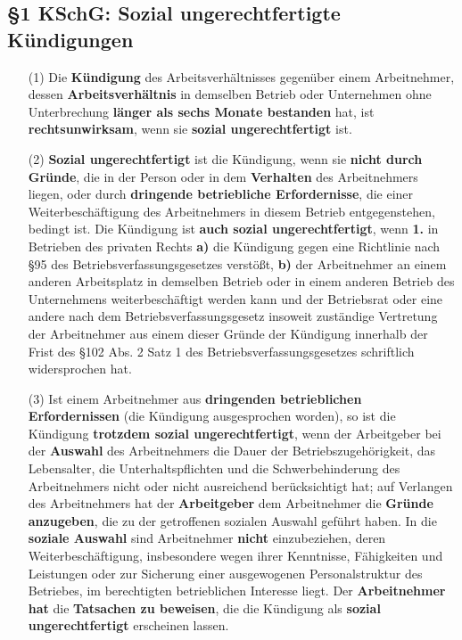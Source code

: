 \documentclass[a4paper, 12pt]{report}
\begin{document}
\subsection{\S 1 KSchG: Sozial ungerechtfertigte Kündigungen}

\begin{itemize}
    \item[(1)] Die \textbf{Kündigung} des Arbeitsverhältnisses gegenüber einem
	Arbeitnehmer, dessen \textbf{Arbeitsverhältnis} in demselben Betrieb
	oder Unternehmen ohne Unterbrechung \textbf{länger als sechs Monate
	bestanden} hat, ist \textbf{rechtsunwirksam}, wenn sie \textbf{sozial
	ungerechtfertigt} ist.
    \item[(2)] \textbf{Sozial ungerechtfertigt} ist die Kündigung, wenn sie
	\textbf{nicht durch Gründe}, die in der Person oder in dem
	\textbf{Verhalten} des Arbeitnehmers liegen, oder durch
	\textbf{dringende betriebliche Erfordernisse}, die einer
	Weiterbeschäftigung des Arbeitnehmers in diesem Betrieb entgegenstehen,
	bedingt ist. Die Kündigung ist \textbf{auch sozial ungerechtfertigt},
	wenn \textbf{1.} in Betrieben des privaten Rechts \textbf{a)} die
	Kündigung gegen eine Richtlinie nach \S 95 des
	Betriebsverfassungsgesetzes verstößt, \textbf{b)} der Arbeitnehmer an
	einem anderen Arbeitsplatz in demselben Betrieb oder in einem anderen
	Betrieb des Unternehmens weiterbeschäftigt werden kann und der
	Betriebsrat oder eine andere nach dem Betriebsverfassungsgesetz insoweit
	zuständige Vertretung der Arbeitnehmer aus einem dieser Gründe der
	Kündigung innerhalb der Frist des \S 102 Abs. 2 Satz 1 des
	Betriebsverfassungsgesetzes schriftlich widersprochen hat.
    \item[(3)] Ist einem Arbeitnehmer aus \textbf{dringenden betrieblichen
	Erfordernissen} (die Kündigung ausgesprochen worden), so ist die
	Kündigung \textbf{trotzdem sozial ungerechtfertigt}, wenn der
	Arbeitgeber bei der \textbf{Auswahl} des Arbeitnehmers die Dauer der
	Betriebszugehörigkeit, das Lebensalter, die Unterhaltspflichten und
	die Schwerbehinderung des Arbeitnehmers nicht oder nicht ausreichend
	berücksichtigt hat; auf Verlangen des Arbeitnehmers hat der
	\textbf{Arbeitgeber} dem Arbeitnehmer die \textbf{Gründe anzugeben},
	die zu der getroffenen sozialen Auswahl geführt haben. In die
	\textbf{soziale Auswahl} sind Arbeitnehmer \textbf{nicht} einzubeziehen,
	deren Weiterbeschäftigung, insbesondere wegen ihrer Kenntnisse,
	Fähigkeiten und Leistungen oder zur Sicherung einer ausgewogenen
	Personalstruktur des Betriebes, im berechtigten betrieblichen Interesse
	liegt.  Der \textbf{Arbeitnehmer hat} die \textbf{Tatsachen zu
	beweisen}, die die Kündigung als \textbf{sozial ungerechtfertigt}
	erscheinen lassen.
\end{itemize}
\end{document}

